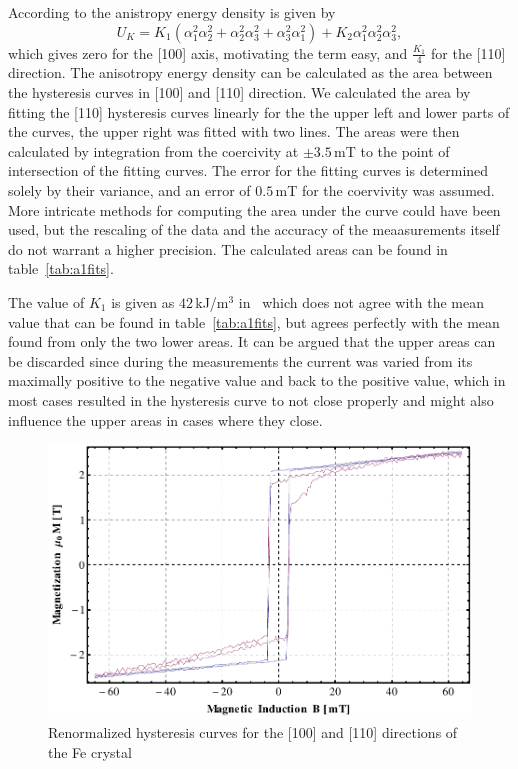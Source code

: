 \documentclass[a4paper,10pt]{scrartcl}
\begin{document}
According to \cite{kittel} the anistropy energy density is given by
\begin{equation}
U_K = K_1(\alpha^{2}_{1}\alpha^{2}_{2}+\alpha^{2}_{2}\alpha^{2}_{3}+\alpha^{2}_{3}\alpha^{2}_{1}) + K_2 \alpha^{2}_{1}\alpha^{2}_{2}\alpha^{2}_{3},
\end{equation} 
which gives zero for the [100] axis, motivating the term easy, and $\tfrac{K_1}{4}$ for the [110] direction. The anisotropy energy density can be calculated as the area between the hysteresis curves in [100] and [110] direction. We calculated the area by fitting the [110] hysteresis curves linearly for the the upper left and lower parts of the curves, the upper right was fitted with two lines. The areas were then calculated by integration from the coercivity at $\pm 3.5\,$mT to the point of intersection of the fitting curves. The error for the fitting curves is determined solely by their variance, and an error of $0.5\,$mT for the coervivity was assumed. More intricate methods for computing the area under the curve could have been used, but the rescaling of the data and the accuracy of the meaasurements itself do not warrant a higher precision.  The calculated areas can be found in table~\ref{tab:a1fits}. 

The value of $K_1$ is given as $42\,$kJ/m$^3$ in~\cite{kittel} which does not agree with the mean value that can be found in table~\ref{tab:a1fits}, but agrees perfectly with the mean found from only the two lower areas. It can be argued that the upper areas can be discarded since during the measurements the current was varied from its maximally positive to the negative value and back to the positive value, which in most cases resulted in the hysteresis curve to not close properly and might also influence the upper areas in cases where they close.

\begin{figure}
\centering
\includegraphics[scale=0.7]{img/a1}
\caption{Renormalized hysteresis curves for the [100] and [110] directions of the Fe crystal \label{fig:a1}}
\end{figure}
\end{document}
